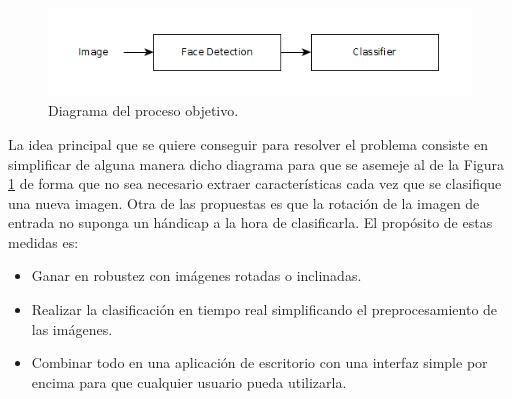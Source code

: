 \documentclass[a4paper,11pt]{book}
\begin{document}
\begin{figure}[h!]
	\centering
	\includegraphics[width=0.7\linewidth]{imagenes/my_fer_diagram}
	\caption[my_diagram]{Diagrama del proceso objetivo.}
	\label{fig:my_fer_diagram}
\end{figure}

La idea principal que se quiere conseguir para resolver el problema consiste en simplificar de alguna manera dicho diagrama para que se asemeje al de la Figura \ref{fig:my_fer_diagram} de forma que no sea necesario extraer características cada vez que se clasifique una nueva imagen. Otra de las propuestas es que la rotación de la imagen de entrada no suponga un hándicap a la hora de clasificarla. El propósito de estas medidas es:\\
\begin{itemize}
	\item Ganar en robustez con imágenes rotadas o inclinadas.
	\item Realizar la clasificación en tiempo real simplificando el preprocesamiento de las imágenes.
	\item Combinar todo en una aplicación de escritorio con una interfaz simple por encima para que cualquier usuario pueda utilizarla.
\end{itemize}

\end{document}
